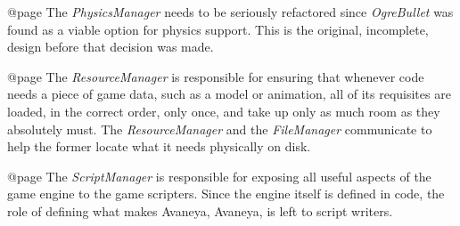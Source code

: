 @page 
The {\sl PhysicsManager} needs to be seriously refactored since {\sl OgreBullet} was found as a viable option for physics support. This is the original, incomplete, design before that decision was made.

    {}

@page 
The {\sl ResourceManager} is responsible for ensuring that whenever code needs a piece of game data, such as a model or animation, all of its requisites are loaded, in the correct order, only once, and take up only as much room as they absolutely must. The {\sl ResourceManager} and the {\sl FileManager} communicate to help the former locate what it needs physically on disk.

    {}

@page 
The {\sl ScriptManager} is responsible for exposing all useful aspects of the game engine to the game scripters. Since the engine itself is defined in code, the role of defining what makes Avaneya, Avaneya, is left to script writers.

    {}


